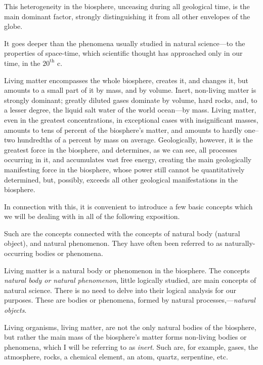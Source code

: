 This heterogeneity in the biosphere, unceasing during all geological time, is
the main dominant factor, strongly distinguishing it from all other envelopes
of the globe.

It goes deeper than the phenomena usually studied in natural science---to the
properties of space-time, which scientific thought has approached only in our
time, in the $20^\mathrm{th}$ c.

Living matter encompasses the whole biosphere, creates it, and changes it, but
amounts to a small part of it by mass, and by volume.  Inert, non-living matter
is strongly dominant; greatly diluted gases dominate by volume, hard rocks,
and, to a lesser degree, the liquid salt water of the world ocean---by mass.
Living matter, even in the greatest concentrations, in exceptional cases with
insignificant masses, amounts to tens of percent of the biosphere's matter, and
amounts to hardly one--two hundredths of a percent by mass on average.
Geologically, however, it is the greatest force in the biosphere, and
determines, as we can see, all processes occurring in it, and accumulates vast
free energy, creating the main geologically manifesting force in the biosphere,
whose power still cannot be quantitatively determined, but, possibly, exceeds
all other geological manifestations in the biosphere.

In connection with this, it is convenient to introduce a few basic concepts
which we will be dealing with in all of the following exposition.


\Section \label{sec:6} %
Such are the concepts connected with the concepts of natural body (natural
object), and natural
phenomenon.  They have often been referred to
as naturally-occurring bodies or phenomena.

Living matter is a natural body or phenomenon in the biosphere.  The concepts
\emph{natural body or natural phenomenon}, little logically studied, are main
concepts of natural science.  There is no need to delve into their logical
analysis for our purposes.  These are bodies or phenomena, formed by natural
processes,---\emph{natural objects}.

Living organisms, living matter, are not the only natural bodies of the
biosphere, but rather the main mass of the biosphere's matter forms non-living
bodies or phenomena, which I will be referring to as
\emph{inert}.  Such are, for example, gases, the
atmosphere, rocks, a chemical element, an atom, quartz, serpentine, etc.

